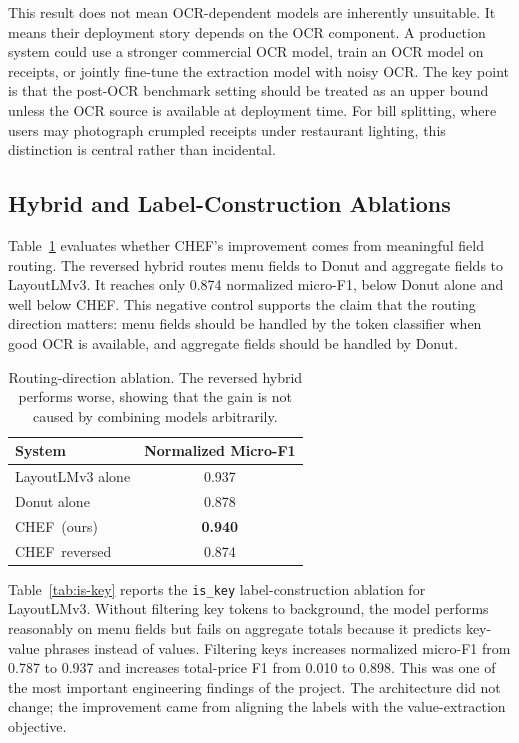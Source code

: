 \documentclass[9pt,twocolumn,twoside]{extarticle}
\newcommand{\chef}{\textsc{CHEF}}
\begin{document}
This result does not mean OCR-dependent models are inherently unsuitable. It means their deployment story depends on the OCR component. A production system could use a stronger commercial OCR model, train an OCR model on receipts, or jointly fine-tune the extraction model with noisy OCR. The key point is that the post-OCR benchmark setting should be treated as an upper bound unless the OCR source is available at deployment time. For bill splitting, where users may photograph crumpled receipts under restaurant lighting, this distinction is central rather than incidental.

\subsection{Hybrid and Label-Construction Ablations}
\label{sec:ablation}

Table~\ref{tab:routing} evaluates whether \chef's improvement comes from meaningful field routing. The reversed hybrid routes menu fields to Donut and aggregate fields to LayoutLMv3. It reaches only 0.874 normalized micro-F1, below Donut alone and well below \chef. This negative control supports the claim that the routing direction matters: menu fields should be handled by the token classifier when good OCR is available, and aggregate fields should be handled by Donut.

\begin{table}[t]
\centering
\caption{Routing-direction ablation. The reversed hybrid performs worse, showing that the gain is not caused by combining models arbitrarily.}
\label{tab:routing}
\small
\begin{tabular}{lc}
\toprule
\textbf{System} & \textbf{Normalized Micro-F1} \\
\midrule
LayoutLMv3 alone & 0.937 \\
Donut alone & 0.878 \\
\chef\ (ours) & \textbf{0.940} \\
\chef\ reversed & 0.874 \\
\bottomrule
\end{tabular}
\end{table}

Table~\ref{tab:is-key} reports the \texttt{is\_key} label-construction ablation for LayoutLMv3. Without filtering key tokens to background, the model performs reasonably on menu fields but fails on aggregate totals because it predicts key-value phrases instead of values. Filtering keys increases normalized micro-F1 from 0.787 to 0.937 and increases total-price F1 from 0.010 to 0.898. This was one of the most important engineering findings of the project. The architecture did not change; the improvement came from aligning the labels with the value-extraction objective.
\end{document}
